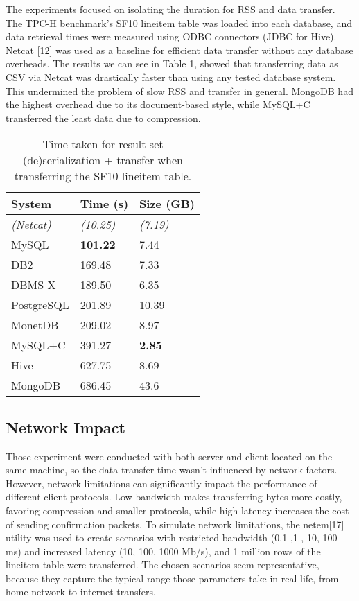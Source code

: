 \documentclass[sigconf]{acmart}
\begin{document}
The experiments focused on isolating the duration for RSS and data transfer. The TPC-H benchmark's SF10 lineitem table was loaded into each database, and data retrieval times were measured using ODBC connectors (JDBC for Hive). Netcat [12] was used as a baseline for efficient data transfer without any database overheads. The results we can see in Table 1, showed that transferring data as CSV via Netcat was drastically faster than using any tested database system. This undermined the problem of slow RSS and transfer in general. MongoDB had the highest overhead due to its document-based style, while MySQL+C transferred the least data due to compression.

\begin{table}[h!]
    \centering
    \caption{Time taken for result set (de)serialization + transfer when transferring the SF10 lineitem table.}
    \begin{tabular}{ p{2cm} | p{2cm}  p{2cm} }
        \textbf{System} & \textbf{Time (s)} & \textbf{Size (GB)} \\ \hline
        \textit{(Netcat)} & \textit{(10.25)} & \textit{(7.19)} \\ \hline
        MySQL & \textbf{101.22} & 7.44 \\ \hline
        DB2 & 169.48 & 7.33 \\ \hline
        DBMS X & 189.50 & 6.35 \\ \hline
        PostgreSQL & 201.89 & 10.39 \\ \hline
        MonetDB & 209.02 & 8.97 \\ \hline
        MySQL+C & 391.27 & \textbf{2.85} \\ \hline
        Hive & 627.75 & 8.69 \\ \hline
        MongoDB & 686.45 & 43.6
    \end{tabular}
\end{table}

\subsection{Network Impact}
Those experiment were conducted with both server and client located on the same machine, so the data transfer time wasn't influenced by network factors. However, network limitations can significantly impact the performance of different client protocols. Low bandwidth makes transferring bytes more costly, favoring compression and smaller protocols, while high latency increases the cost of sending confirmation packets.
To simulate network limitations, the netem[17] utility was used to create scenarios with restricted bandwidth (0.1 ,1 , 10, 100 ms) and increased latency (10, 100, 1000 Mb/s), and 1 million rows of the lineitem table were transferred. The chosen scenarios seem representative, because they capture the typical range those parameters take in real life, from home network to internet transfers.
\end{document}

